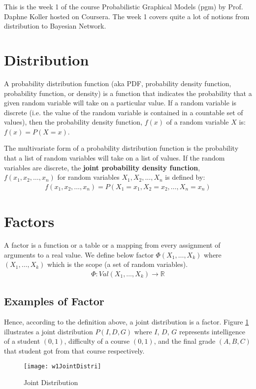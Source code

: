 This is the week 1 of the course Probabilistic Graphical Models (pgm) by Prof. Daphne Koller hosted on Coursera. The week 1 covers quite a lot of notions from distribution to Bayesian Network.

\section{Distribution}
A probability distribution function (aka PDF, probability density function, probability function, or density) is a function that indicates the probability that a given random variable will take on a particular value. If a random variable is discrete (i.e. the value of the random variable is contained in a countable set of values), then the probability density function, $f(x)$ of a random variable $X$ is: $f(x) = P(X = x)$.

The multivariate form of a probability distribution function is the probability that a list of random variables will take on a list of values. If the random variables are discrete, the \textbf{joint probability density function}, $f(x_1, x_2, …, x_n)$ for random variables $X_1, X_2, ..., X_n$ is defined by: 
\begin{align}
f(x_1, x_2, \ldots, x_n) = P(X_1=x_1, X_2=x_2, \ldots, X_n=x_n)
\end{align}

\section{Factors}
A factor is a function or a table or a mapping from every assignment of arguments to a real value. We define below factor $\Phi(X_1, \ldots, X_k)$ where $(X_1, \ldots, X_k)$ which is the scope (a set of random variables).
\begin{align}
\Phi: Val(X_1, \ldots, X_k) \rightarrow \mathbb{R}
\end{align}

\subsection{Examples of Factor}
Hence, according to the definition above, a joint distribution is a factor. Figure \ref{w1JointDistri} illustrates a joint distribution $P(I,D,G)$ where $I$, $D$, $G$ represents intelligence of a student $(0, 1)$, difficulty of a course $(0,1)$, and the final grade $(A,B,C)$ that student got from that course respectively.
\begin{figure}[!ht]
\centering
\texttt{[image: w1JointDistri]}
\caption{Joint Distribution}
\label{w1JointDistri}
\end{figure}


